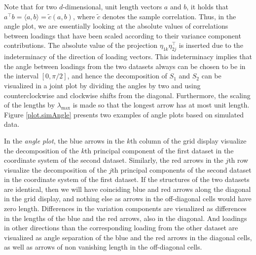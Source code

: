 \documentclass[titlepage,11pt,twoside]{article}
\newcommand{\hl}[1]{\textcolor{magenta}{#1}}
\begin{document}
Note that for two $d$-dimensional, unit length vectors $a$ and $b$, it holds that $ a^\top b = \langle a, b \rangle = \tilde{c}(a,b)$, where $\tilde{c}$ denotes the sample correlation. Thus, in the angle plot, we are essentially looking at the absolute values of correlations between loadings that have been scaled according to their variance component contributions. The absolute value of the projection $\eta_{1k} \eta_{2j}^\top$ is inserted due to the indeterminacy of the direction of loading vectors. This indeterminacy implies that the angle between loadings from the two datasets always can be chosen to be in the interval $[0,\pi/2]$, and hence the decomposition of $S_1$ and $S_2$ can be visualized in a joint plot by dividing the angles by two and using counterclockwise and clockwise shifts from the diagonal. Furthermore, the scaling of the lengths by $\lambda_{\max}$ is made so that the longest arrow has at most unit length. Figure \ref{plot.simAngle} presents two examples of angle plots based on simulated data.

In the \emph{angle plot}, the blue arrows in the $k$th column of the grid display visualize the decomposition of the $k$th principal component of the first dataset in the coordinate system of the second dataset. Similarly, the red arrows in the $j$th row visualize the decomposition of the $j$th principal components of the second dataset in the coordinate system of the first dataset. %
If the structures of the two datasets are identical, then we will have coinciding blue and red arrows along the diagonal in the grid display, and nothing else as arrows in the off-diagonal cells would have zero length. Differences in the variation components are visualized as differences in the lengths of the blue and the red arrows, also in the diagonal. And loadings in other directions than the corresponding loading from the other dataset are visualized as angle separation of the blue and the red arrows in the diagonal cells, as well as arrows of non vanishing length in the off-diagonal cells.
\end{document}
